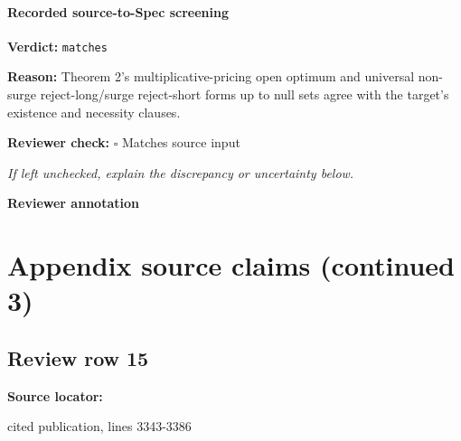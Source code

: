 \documentclass[10pt]{article}
\newcommand{\reviewerbox}{%
  \par\noindent\fbox{\parbox{0.96\linewidth}{\rule{0pt}{0.38in}}}\par
}
\newcommand{\reviewmatch}[1]{%
  \par\noindent\textbf{Reviewer check:} $\square$\; #1\par
  \noindent\emph{If left unchecked, explain the discrepancy or uncertainty below.}\par
}
\begin{document}
\paragraph{Recorded source-to-Spec screening}
\textbf{Verdict:} \texttt{matches}
\\
{\raggedright
\textbf{Reason:} Theorem 2's multiplicative-\allowbreak{}pricing open optimum and universal non-\allowbreak{}surge reject-\allowbreak{}long/\allowbreak{}surge reject-\allowbreak{}short forms up to null sets agree with the target's existence and necessity clauses.\allowbreak{}
\par}
\reviewmatch{Matches source input}
\noindent\textbf{Reviewer annotation}\par
\reviewerbox
\clearpage
\hypertarget{source-claim-5a2021856d51c6f7}{}
\hypertarget{source-section-13054b3f2d04f1de}{}
\section*{Appendix source claims (continued 3)}
\subsection*{Review row 15}
\textbf{Source locator:} {\footnotesize\raggedright cited publication, lines 3343-\allowbreak{}3386\par}
\end{document}
